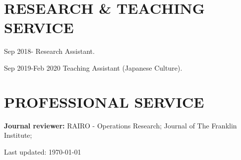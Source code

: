 \documentclass[letterpaper]{article}
\def\footerlink{http://jblevins.org/projects/cv-template/}
\begin{document}
\section*{RESEARCH \& TEACHING SERVICE}
\begin{enumerate}[label={[\arabic*]}, noitemsep]
\item Sep 2018-\hspace{5.4em} Research Assistant.
\item Sep 2019-Feb 2020 \hspace{1.3em} Teaching Assistant (Japanese Culture).
\end{enumerate}

\section*{PROFESSIONAL SERVICE}
\textbf{Journal reviewer:} RAIRO - Operations Research; Journal of The Franklin Institute;


\bigskip

\begin{center}
  \begin{footnotesize}
    Last updated: \today \\
  \end{footnotesize}
\end{center}
\end{document}

